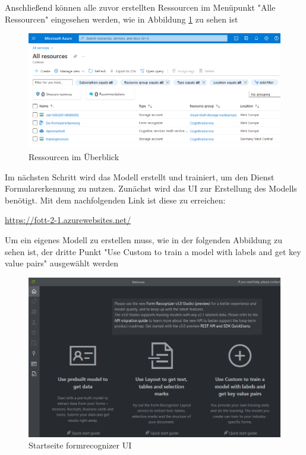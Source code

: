 Anschließend können alle zuvor erstellten Ressourcen im Menüpunkt "Alle Ressourcen" eingesehen werden, wie in Abbildung \ref{fig:ressourcen-überblick} zu sehen ist

\begin{figure}[h]
    \centering
    \includegraphics[scale=0.6]{sections/cloud-computing/images/alle-ressourcen.PNG}
    \caption{Ressourcen im Überblick}
    \label{fig:ressourcen-überblick}
\end{figure}

Im nächsten Schritt wird das Modell erstellt und trainiert, um den Dienst Formularerkennung zu nutzen. Zunächst wird das UI zur Erstellung 
des Modells benötigt. Mit dem nachfolgenden Link ist diese zu erreichen: 

\begin{center}\url{https://fott-2-1.azurewebsites.net/}\end{center}

Um ein eigenes Modell zu erstellen muss, wie in der folgenden Abbildung zu sehen ist, der dritte Punkt "Use Custom to train a model with labels and get key value pairs"
ausgewählt werden

\begin{figure}[h]
    \centering
    \includegraphics[scale=0.4]{sections/cloud-computing/images/formrecognizer-UI.PNG}
    \caption{Startseite formrecognizer UI}
    \label{fig:formrecognizer-UI}
\end{figure}

